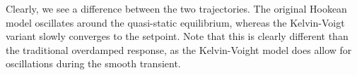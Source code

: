 \begin{example}
\begin{figure}[!h]
   \vspace{-0.1cm}
   \label{fig:C2:creep}
 \end{figure}
%
Clearly, we see a difference between the two trajectories. The original Hookean model oscillates around the quasi-static equilibrium, whereas the Kelvin-Voigt variant slowly converges to the setpoint. Note that this is clearly different than the traditional overdamped response, as the Kelvin-Voight model does allow for oscillations during the smooth transient. %
%


\end{example}

